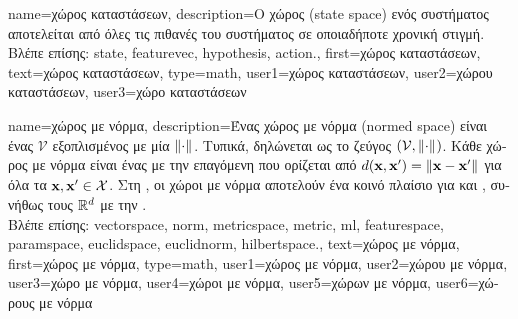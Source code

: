 {name={\foreignlanguage{greek}{χώρος καταστάσεων}},
	description={\foreignlanguage{greek}{Ο χώρος}  
		(state space) \foreignlanguage{greek}{ενός συστήματος αποτελείται από όλες τις πιθανές}  
		 \foreignlanguage{greek}{του συστήματος σε οποιαδήποτε χρονική στιγμή.} 
		\\
		\foreignlanguage{greek}{Βλέπε επίσης:} \gls{state}, \gls{featurevec}, \gls{hypothesis}, \gls{action}.},
	first={\foreignlanguage{greek}{χώρος καταστάσεων}},
	text={\foreignlanguage{greek}{χώρος καταστάσεων}},
	type=math,
	user1={\foreignlanguage{greek}{χώρος καταστάσεων}}, %
  	user2={\foreignlanguage{greek}{χώρου καταστάσεων}}, %
	user3={\foreignlanguage{greek}{χώρο καταστάσεων}} %
}

{name={\foreignlanguage{greek}{χώρος με νόρμα}},
	description={\foreignlanguage{greek}{Ένας χώρος με νόρμα} (normed space) 
		\foreignlanguage{greek}{είναι ένας}  $\mathcal{V}$ \foreignlanguage{greek}{εξοπλισμένος με μία} 
		 $\normgeneric{\cdot}{}$. \foreignlanguage{greek}{Τυπικά, δηλώνεται ως το ζεύγος $(\mathcal{V}, \normgeneric{\cdot}{})$. 
		Κάθε χώρος με νόρμα είναι ένας}  \foreignlanguage{greek}{με την επαγόμενη}  
		\foreignlanguage{greek}{που ορίζεται από $\metric{\featurevec}{\featurevec'} = \normgeneric{\featurevec - \featurevec'}{}$ 
		για όλα τα ${\bf x}, {\bf x}' \in \mathcal{X}$. Στη} , \foreignlanguage{greek}{οι χώροι με νόρμα αποτελούν 
		ένα κοινό πλαίσιο για}  \foreignlanguage{greek}{και} , 
		\foreignlanguage{greek}{συνήθως τους}  $\mathbb{R}^d$ \foreignlanguage{greek}{με την}  
		.  
		\\
		\foreignlanguage{greek}{Βλέπε επίσης:} \gls{vectorspace}, \gls{norm}, \gls{metricspace}, \gls{metric}, \gls{ml}, \gls{featurespace}, 
		\gls{paramspace}, \gls{euclidspace}, \gls{euclidnorm}, \gls{hilbertspace}.},
	text={\foreignlanguage{greek}{χώρος με νόρμα}},
	first={\foreignlanguage{greek}{χώρος με νόρμα}},
	type=math,
	user1={\foreignlanguage{greek}{χώρος με νόρμα}}, %
  	user2={\foreignlanguage{greek}{χώρου με νόρμα}}, %
	user3={\foreignlanguage{greek}{χώρο με νόρμα}}, %
	user4={\foreignlanguage{greek}{χώροι με νόρμα}}, %
  	user5={\foreignlanguage{greek}{χώρων με νόρμα}}, %
	user6={\foreignlanguage{greek}{χώρους με νόρμα}} %
}

